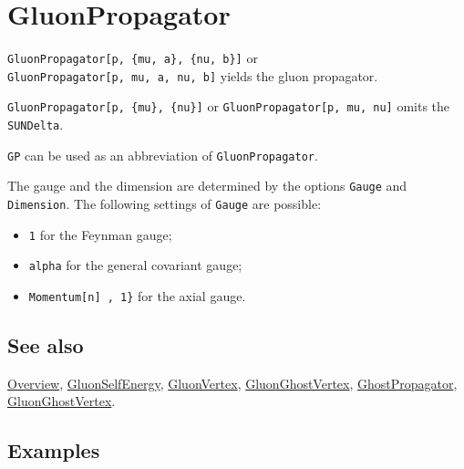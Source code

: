 \documentclass[../FeynCalcManual.tex]{subfiles}
\begin{document}
\hypertarget{gluonpropagator}{%
\section{GluonPropagator}\label{gluonpropagator}}

\texttt{GluonPropagator[\allowbreak{}p,\ \allowbreak{}\{\allowbreak{}mu,\ \allowbreak{}a\},\ \allowbreak{}\{\allowbreak{}nu,\ \allowbreak{}b\}]}
or
\texttt{GluonPropagator[\allowbreak{}p,\ \allowbreak{}mu,\ \allowbreak{}a,\ \allowbreak{}nu,\ \allowbreak{}b]}
yields the gluon propagator.

\texttt{GluonPropagator[\allowbreak{}p,\ \allowbreak{}\{\allowbreak{}mu\},\ \allowbreak{}\{\allowbreak{}nu\}]}
or
\texttt{GluonPropagator[\allowbreak{}p,\ \allowbreak{}mu,\ \allowbreak{}nu]}
omits the \texttt{SUNDelta}.

\texttt{GP} can be used as an abbreviation of \texttt{GluonPropagator}.

The gauge and the dimension are determined by the options \texttt{Gauge}
and \texttt{Dimension}. The following settings of \texttt{Gauge} are
possible:

\begin{itemize}
\tightlist
\item
  \texttt{1} for the Feynman gauge;\\
\item
  \texttt{alpha} for the general covariant gauge;
\item
  \texttt{Momentum[\allowbreak{}n] ,\ \allowbreak{}1\}} for the axial
  gauge.
\end{itemize}

\subsection{See also}

\hyperlink{toc}{Overview}, \hyperlink{gluonselfenergy}{GluonSelfEnergy},
\hyperlink{gluonvertex}{GluonVertex},
\hyperlink{gluonghostvertex}{GluonGhostVertex},
\hyperlink{ghostpropagator}{GhostPropagator},
\hyperlink{gluonghostvertex}{GluonGhostVertex}.

\subsection{Examples}

\begin{Shaded}
\begin{Highlighting}[]
\OperatorTok{[}\OperatorTok{,} \SpecialCharTok{\textbackslash{}}\OperatorTok{[}\OperatorTok{],} \OperatorTok{,} \SpecialCharTok{\textbackslash{}}\OperatorTok{[}\OperatorTok{],} \OperatorTok{]} 
 
\OperatorTok{[}\SpecialCharTok{\%}\OperatorTok{]}
\end{Highlighting}
\end{Shaded}
\end{document}
